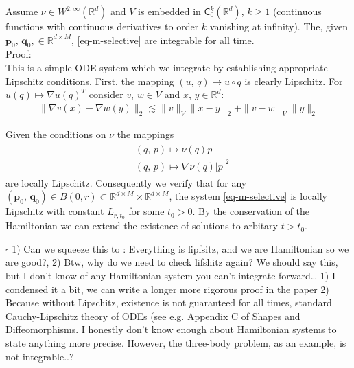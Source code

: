 \documentclass[runningheads]{llncs}
\newcommand{\norm}[2]{\| #1 \|_{ #2 }}
\newcommand{\vnorm}[1]{\norm{ #1 }{V}}
\newcommand{\ltwonorm}[1]{\norm{ #1 }{2}}
\newcommand{\Rd}{\mathbb{R}^{d}}
\newcommand{\RdM}{\mathbb{R}^{d\times M}}
\begin{document}
\begin{theorem}
Assume $\nu \in W^{2, \infty}(\Rd)$ and $V$ is embedded in
$\textsf{C}_0^k(\Rd)$, $k\geq 1$ (continuous functions with continuous
derivatives to order $k$ vanishing at infinity). The, given $\mathbf
p_0,\,\mathbf q_0, \in \RdM$, \eqref{eq-m-selective} are integrable for all
time.\\

Proof:\\

This is a simple ODE system which we integrate by establishing appropriate
Lipschitz conditions. First, the mapping $(u,\,q)\mapsto u\circ q$ is clearly 
Lipschitz. For $u(q)\mapsto\nabla u(q)^T$ consider $v,\,w \in V$ and
$x,\,y\in\Rd$:
\begin{align}
\ltwonorm{\nabla v(x) - \nabla w(y)} \lesssim \vnorm{v} \ltwonorm{x-y} + \vnorm{v-w}\ltwonorm{y}
\end{align}

Given the conditions on $\nu$ the mappings
\begin{align}
  \begin{split}
    & (q,\,p)\mapsto \nu(q)p\\
    &(q,\,p)\mapsto \nabla \nu(q)|p|^2
  \end{split}\label{nu_maps}
\end{align}
are locally Lipschitz. Consequently we verify that for any $(\mathbf
p_0,\,\mathbf q_0)\in B(0,r)\subset \RdM\times\RdM$, the system
\eqref{eq-m-selective} is locally Lipschitz with constant $L_{r,t_0}$ for some
$t_0>0$. By the conservation of the Hamiltonian we can extend the existence of
solutions to arbitary $t>t_0$.

{\hfill $\square$}
{\color{red} 1) Can we squeeze this to : Everything is lipfsitz, and we are
Hamiltonian so we are good?, 2) Btw, why do we need to check lifshitz again? We
should say this, but I don't know of any Hamiltonian system you can't integrate
forward\dots}{\color{blue} 1) I condensed it a bit, we can write a longer more
rigorous proof in the paper 2) Because without Lipschitz, existence is not
guaranteed for all times, standard Cauchy-Lipschitz theory of ODEs (see e.g.
Appendix C of Shapes and Diffeomorphisms. I honestly don't know enough about
Hamiltonian systems to state anything more precise. However, the three-body
problem, as an example, is not integrable..?}
\end{theorem}

\end{document}

